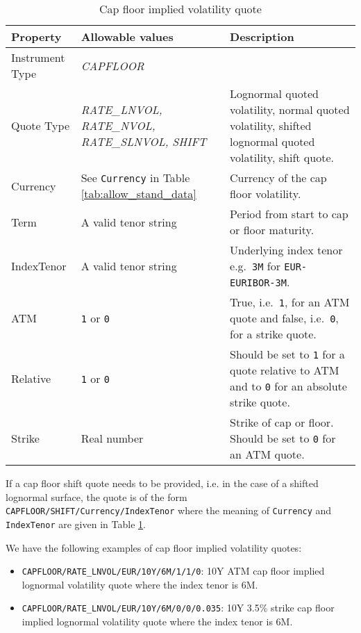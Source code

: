 \begin{table}[H]
\centering
  \begin{tabular}{|p{3cm}|p{3.5cm}|p{7cm}|}
    \hline
    {\bf Property} & {\bf Allowable values} & {\bf Description} \\ \hline
    Instrument Type & \emph{CAPFLOOR} & \\ \hline
    Quote Type &  \emph{RATE\_LNVOL, RATE\_NVOL, RATE\_SLNVOL, SHIFT} & Lognormal quoted volatility, normal quoted volatility, shifted lognormal quoted volatility, shift quote. \\ \hline
    Currency & See \lstinline!Currency! in Table \ref{tab:allow_stand_data}&  Currency of the cap floor volatility. \\ \hline
    Term & A valid tenor string & Period from start to cap or floor maturity. \\ \hline
    IndexTenor & A valid tenor string & Underlying index tenor e.g.\ \lstinline!3M! for \lstinline!EUR-EURIBOR-3M!. \\ \hline
    ATM & \lstinline!1! or \lstinline!0! & True, i.e.\ \lstinline!1!, for an ATM quote and false, i.e.\ \lstinline!0!, for a strike quote. \\ \hline
    Relative & \lstinline!1! or \lstinline!0! & Should be set to \lstinline!1! for a quote relative to ATM  and to \lstinline!0! for an absolute strike quote. \\ \hline
    Strike & Real number & Strike of cap or floor. Should be set to \lstinline!0! for an ATM quote. \\ \hline
  \end{tabular}
  \caption{Cap floor implied volatility quote}
  \label{tab:capfloor_implvol_quote}
\end{table}

If a cap floor shift quote needs to be provided, i.e. in the case of a shifted lognormal surface, the quote is of the form \lstinline!CAPFLOOR/SHIFT/Currency/IndexTenor! where the meaning of \lstinline!Currency! and \lstinline!IndexTenor! are given in Table \ref{tab:capfloor_implvol_quote}.

We have the following examples of cap floor implied volatility quotes:
\begin{itemize}
\item \lstinline!CAPFLOOR/RATE_LNVOL/EUR/10Y/6M/1/1/0!: 10Y ATM cap floor implied lognormal volatility quote where the index tenor is 6M.
\item \lstinline!CAPFLOOR/RATE_LNVOL/EUR/10Y/6M/0/0/0.035!: 10Y 3.5\% strike cap floor implied lognormal volatility quote where the index tenor is 6M.
\end{itemize}

